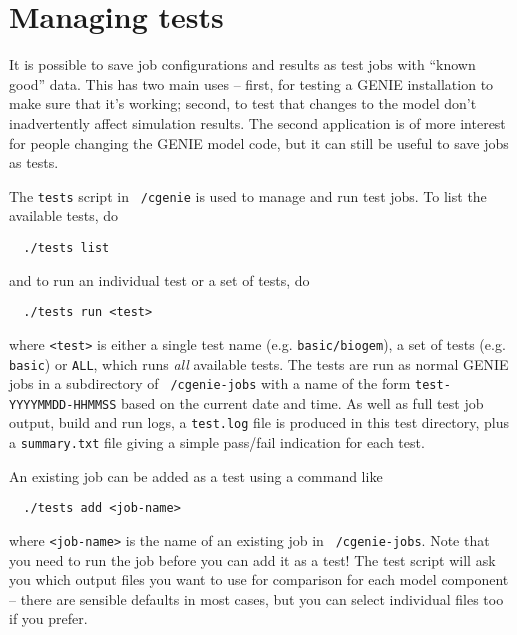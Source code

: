 \documentclass[a4paper,10pt,article]{memoir}
\begin{document}
\section{Managing tests}

It is possible to save job configurations and results as test jobs
with ``known good'' data.  This has two main uses -- first, for
testing a GENIE installation to make sure that it's working; second,
to test that changes to the model don't inadvertently affect
simulation results.  The second application is of more interest for
people changing the GENIE model code, but it can still be useful to
save jobs as tests.

The \texttt{tests} script in \texttt{~/cgenie} is used to manage and
run test jobs.  To list the available tests, do
\begin{verbatim}
  ./tests list
\end{verbatim}
and to run an individual test or a set of tests, do
\begin{verbatim}
  ./tests run <test>
\end{verbatim}
where \texttt{<test>} is either a single test name (e.g.
\texttt{basic/biogem}), a set of tests (e.g. \texttt{basic}) or
\texttt{ALL}, which runs \emph{all} available tests.  The tests are
run as normal GENIE jobs in a subdirectory of \texttt{~/cgenie-jobs}
with a name of the form \texttt{test-YYYYMMDD-HHMMSS} based on the
current date and time.  As well as full test job output, build and run
logs, a \texttt{test.log} file is produced in this test directory,
plus a \texttt{summary.txt} file giving a simple pass/fail indication
for each test.

An existing job can be added as a test using a command like
\begin{verbatim}
  ./tests add <job-name>
\end{verbatim}
where \texttt{<job-name>} is the name of an existing job in
\texttt{~/cgenie-jobs}.  Note that you need to run the job before you
can add it as a test!  The test script will ask you which output files
you want to use for comparison for each model component -- there are
sensible defaults in most cases, but you can select individual files
too if you prefer.
\end{document}
